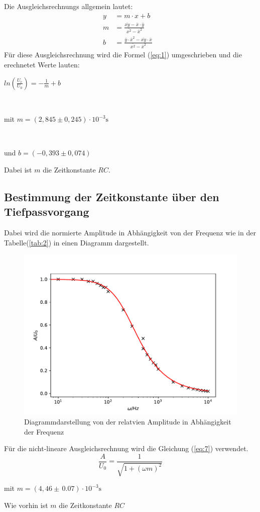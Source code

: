 Die Ausgleichsrechnungs allgemein lautet:
\begin{align}
  y & = m \cdot x + b \label{eq:9}\\
  m & = \frac {\bar{xy} - \bar{x} \cdot \bar{y}} {\bar{x^2} -\bar{x}^2}&  \label{eq:10}\\
  b & = \frac {\bar{y} \cdot \bar{x}^2 - \bar{xy} \cdot \bar{x}} {\bar{x^2}-\bar{x}^2}& \label{eq:11}
\end{align}
Für diese Ausgleichsrechnung wird die Formel (\ref{eq:1}) umgeschrieben und die erechnetet Werte lauten: \\
\newline
\centerline{$ln(\frac{U_\text{c}}{U_\text{0}}) = -\frac{1}{m} + b$}\\
\newline
\centerline{mit $m = (2,845 \pm 0,245) \cdot 10^{-3} \si{\second}$}\\
\newline
\centerline{und $b = (-0,393 \pm 0,074)$}
\newline
Dabei ist $m$ die Zeitkonstante $RC$.
\subsection{Bestimmung der Zeitkonstante über den Tiefpassvorgang}
Dabei wird die normierte Amplitude in Abhängigkeit von der Frequenz wie in der Tabelle(\ref{tab:2}) in
einen Diagramm dargestellt.

\begin{figure}[H]
  \centering
  \includegraphics[width=\textwidth]{Diagramm2.pdf}
  \caption{Diagrammdarstellung von der relatvien Amplitude in Abhängigkeit der Frequenz}
  \label{fig:7}
\end{figure}
Für die nicht-lineare Ausgleichsrechnung wird die Gleichung (\ref{eq:7}) verwendet.
\begin{equation*}
  \frac{A}{U_0} = \frac{1}{\sqrt{1 + (\omega m)^2}}
\end{equation*}
\centerline{mit $m = (4,46 \pm \, 0.07) \cdot 10^{-3} \si{\second}$}
Wie vorhin ist $m$ die Zeitkonstante $RC$
